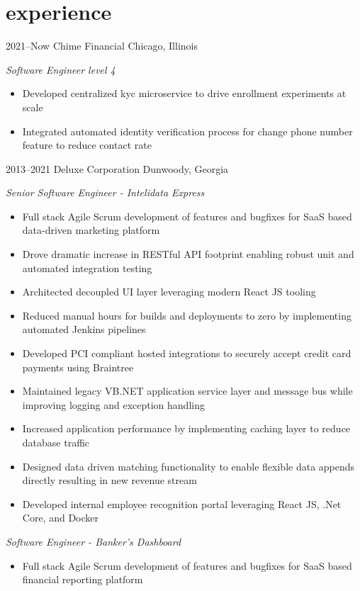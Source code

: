 \documentclass[]{friggeri-cv} %
\begin{document}
\section{experience}
\begin{entrylist}

\entry
{2021--Now}
{Chime Financial}
{Chicago, Illinois}
{\raggedright
  \emph{Software Engineer level 4}
  \begin{itemize}
    \item Developed centralized kyc microservice to drive enrollment experiments at scale
		\item Integrated automated identity verification process for change phone number feature to reduce contact rate
  \end{itemize}
}
\entry
{2013--2021}
{Deluxe Corporation}
{Dunwoody, Georgia}
{\raggedright
  \emph{Senior Software Engineer - Intelidata Express}
  \begin{itemize}
    \item Full stack Agile Scrum development of features and bugfixes for SaaS based data-driven marketing platform 
    \item Drove dramatic increase in RESTful API footprint enabling robust unit and automated integration testing
    \item Architected decoupled UI layer leveraging modern React JS tooling
    \item Reduced manual hours for builds and deployments to zero by implementing automated Jenkins pipelines
    \item Developed PCI compliant hosted integrations to securely accept credit card payments using Braintree
    \item Maintained legacy VB.NET application service layer and message bus while improving logging and exception handling
    \item Increased application performance by implementing caching layer to reduce database traffic
    \item Designed data driven matching functionality to enable flexible data appends directly resulting in new revenue stream
    \item Developed internal employee recognition portal leveraging React JS, .Net Core, and Docker
  \end{itemize}
  \emph{Software Engineer - Banker's Dashboard}
  \begin{itemize}
    \item Full stack Agile Scrum development of features and bugfixes for SaaS based financial reporting platform

\end{itemize}}
\end{entrylist}
\end{document}
